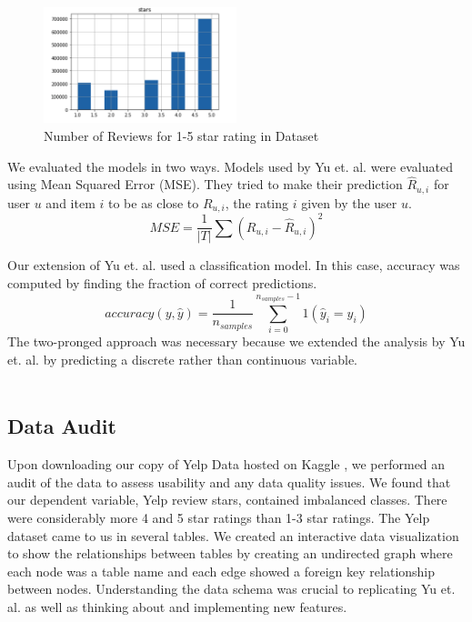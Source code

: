 \documentclass[12pt]{article}
\begin{document}
  \begin{figure}[h]
  \caption{Number of Reviews for 1-5 star rating in Dataset}
  \centering
  \includegraphics[width=0.5\textwidth]{rating}
  \end{figure}

We evaluated the models in two ways. Models used by Yu et. al. \cite{yu2015restaurants}
were evaluated using Mean Squared Error (MSE). They tried to make their prediction $\hat{R}_{u,i}$
for user $u$ and item $i$ to be as close to $R_{u,i}$, the rating $i$ given by the user $u$.
\[
MSE = \frac{1}{|T|}\sum(R_{u,i} - \hat{R}_{u,i})^2
\]

Our extension of Yu et. al. \cite{yu2015restaurants} used a classification model. In this
case, accuracy was computed by finding the fraction of correct predictions.
\[
accuracy(y, \hat{y}) = \frac{1}{n_{samples}} \sum_{i=0}^{n_{samples} - 1} 1(\hat{y}_i = y_i)
\]
The two-pronged approach was necessary because we extended the analysis by Yu et. al.
\cite{yu2015restaurants} by predicting a discrete rather than continuous variable.\\ \\

\subsection{Data Audit}

Upon downloading our copy of Yelp Data hosted on Kaggle \cite{YelpData59:online}, we performed
an audit of the data to assess usability and any data quality issues. We found that our
dependent variable, Yelp review stars, contained imbalanced classes. There were considerably
more 4 and 5 star ratings than 1-3 star ratings. The Yelp dataset came to us in several tables.
We created an interactive data visualization to show the relationships between tables by creating
an undirected graph where each node was a table name and each edge showed a foreign key
relationship between nodes. Understanding the data schema was crucial to replicating
Yu et. al. \cite{yu2015restaurants} as well as thinking about and implementing new features.
\end{document}
